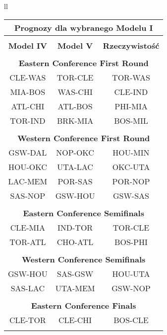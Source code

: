 \documentclass[inzynierska]{pwr_wmat_praca_dyplomowa}
\theoremstyle{plain}
\numberwithin{theorem}{chapter}
\theoremstyle{definition}
\numberwithin{theorem}{chapter}
\begin{document}
\begin{table}[]
	\centering
	\begin{tabular}{ll}

	\begin{tabular}{|c|c|c|}
	\hline
	\multicolumn{3}{|c|}{\textbf{Prognozy dla wybranego Modelu I}} \\\hline
	\multicolumn{3}{|c|}{} \\\hline	
	\textbf{Model IV}& \textbf{Model V} &\textbf{Rzeczywistość}\\\hline	
	
	\multicolumn{3}{|c|}{} \\\hline	
	\multicolumn{3}{|c|}{\textbf{Eastern Conference First Round}} \\\hline
	CLE-WAS&TOR-CLE  &TOR-WAS\\\hline
	MIA-BOS&WAS-CHI &CLE-IND\\\hline
	ATL-CHI&ATL-BOS &PHI-MIA\\\hline
	TOR-IND&BRK-MIA &BOS-MIL\\\hline
	\multicolumn{3}{|c|}{} \\\hline
	
	\multicolumn{3}{|c|}{\textbf{Western Conference First Round}} \\\hline
	GSW-DAL&NOP-OKC &HOU-MIN\\\hline
	HOU-OKC&UTA-LAC &OKC-UTA\\\hline
	LAC-MEM&POR-SAS &POR-NOP\\\hline
	SAS-NOP&GSW-HOU &GSW-SAS\\\hline
	\multicolumn{3}{|c|}{} \\\hline
	
	\multicolumn{3}{|c|}{\textbf{Eastern Conference Semifinals}} \\\hline
	CLE-MIA&IND-TOR &TOR-CLE\\\hline
	TOR-ATL&CHO-ATL &BOS-PHI\\\hline
	\multicolumn{3}{|c|}{} \\\hline
	
	\multicolumn{3}{|c|}{\textbf{Western Conference Semifinals}} \\\hline
	GSW-HOU&SAS-GSW &HOU-UTA\\\hline
	SAS-LAC&UTA-MEM &GSW-NOP\\\hline
	\multicolumn{3}{|c|}{} \\\hline
	
	\multicolumn{3}{|c|}{\textbf{Eastern Conference Finals}} \\\hline
	CLE-TOR&CLE-CHI &BOS-CLE\\\hline
	\multicolumn{3}{|c|}{} \\\hline
	

\end{tabular}
\end{tabular}
\end{table}
\end{document}
